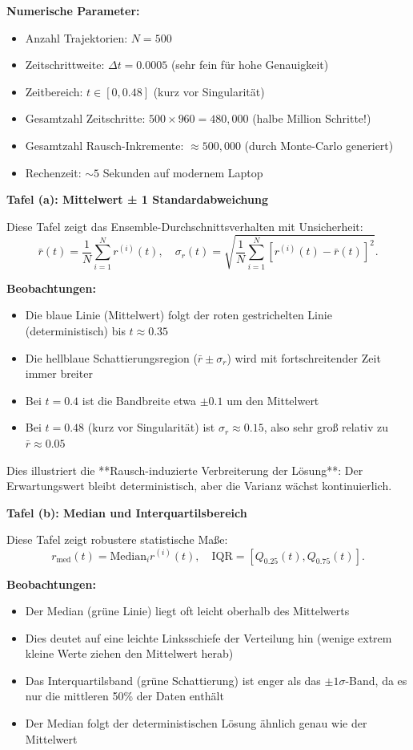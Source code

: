 \documentclass[a4paper,12pt]{article}
\theoremstyle{definition}
\begin{document}
\textbf{Numerische Parameter:}
\begin{itemize}
	\item Anzahl Trajektorien: $N = 500$
	\item Zeitschrittweite: $\Delta t = 0.0005$ (sehr fein für hohe Genauigkeit)
	\item Zeitbereich: $t \in [0, 0.48]$ (kurz vor Singularität)
	\item Gesamtzahl Zeitschritte: $500 \times 960 = 480,000$ (halbe Million Schritte!)
	\item Gesamtzahl Rausch-Inkremente: $\approx 500,000$ (durch Monte-Carlo generiert)
	\item Rechenzeit: $\sim 5$ Sekunden auf modernem Laptop
\end{itemize}

\textbf{Tafel (a): Mittelwert ± 1 Standardabweichung}

Diese Tafel zeigt das Ensemble-Durchschnittsverhalten mit Unsicherheit:
\[
\bar{r}(t) = \frac{1}{N} \sum_{i=1}^N r^{(i)}(t), \quad \sigma_r(t) = \sqrt{\frac{1}{N} \sum_{i=1}^N [r^{(i)}(t) - \bar{r}(t)]^2}.
\]

\textbf{Beobachtungen:}
\begin{itemize}
	\item Die blaue Linie (Mittelwert) folgt der roten gestrichelten Linie (deterministisch) bis $t \approx 0.35$
	\item Die hellblaue Schattierungsregion ($\bar{r} \pm \sigma_r$) wird mit fortschreitender Zeit immer breiter
	\item Bei $t = 0.4$ ist die Bandbreite etwa $\pm 0.1$ um den Mittelwert
	\item Bei $t = 0.48$ (kurz vor Singularität) ist $\sigma_r \approx 0.15$, also sehr groß relativ zu $\bar{r} \approx 0.05$
\end{itemize}

Dies illustriert die **Rausch-induzierte Verbreiterung der Lösung**: Der Erwartungswert bleibt deterministisch, aber die Varianz wächst kontinuierlich.

\textbf{Tafel (b): Median und Interquartilsbereich}

Diese Tafel zeigt robustere statistische Maße:
\[
r_{\text{med}}(t) = \text{Median}_{i} r^{(i)}(t), \quad \text{IQR} = [Q_{0.25}(t), Q_{0.75}(t)].
\]

\textbf{Beobachtungen:}
\begin{itemize}
	\item Der Median (grüne Linie) liegt oft leicht oberhalb des Mittelwerts
	\item Dies deutet auf eine leichte Linksschiefe der Verteilung hin (wenige extrem kleine Werte ziehen den Mittelwert herab)
	\item Das Interquartilsband (grüne Schattierung) ist enger als das $\pm 1\sigma$-Band, da es nur die mittleren 50\% der Daten enthält
	\item Der Median folgt der deterministischen Lösung ähnlich genau wie der Mittelwert
\end{itemize}
\end{document}
